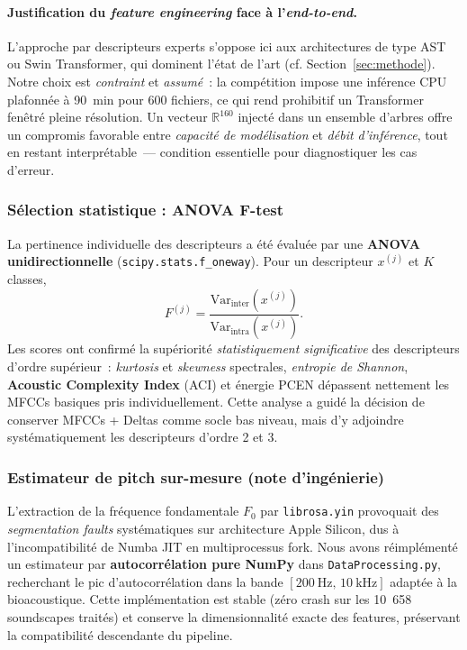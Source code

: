\paragraph{Justification du \textit{feature engineering} face à
    l'\textit{end-to-end}.} L'approche par descripteurs experts s'oppose
ici aux architectures de type AST ou Swin Transformer, qui dominent
l'état de l'art (cf. Section~\ref{sec:methode}). Notre choix est
\textit{contraint} et \textit{assumé}~: la compétition impose une
inférence CPU plafonnée à 90~min pour 600 fichiers, ce qui rend
prohibitif un Transformer fenêtré pleine résolution. Un vecteur
$\mathbb{R}^{160}$ injecté dans un ensemble d'arbres offre un compromis
favorable entre \textit{capacité de modélisation} et \textit{débit
    d'inférence}, tout en restant interprétable~— condition essentielle pour
diagnostiquer les cas d'erreur.

\subsubsection{Sélection statistique : ANOVA F-test}
La pertinence individuelle des descripteurs a été évaluée par une
\textbf{ANOVA unidirectionnelle} (\texttt{scipy.stats.f\_oneway}).
Pour un descripteur $x^{(j)}$ et $K$ classes,
\[
    F^{(j)} = \frac{\mathrm{Var}_{\text{inter}}(x^{(j)})}
    {\mathrm{Var}_{\text{intra}}(x^{(j)})}.
\]
Les scores ont confirmé la supériorité \textit{statistiquement
    significative} des descripteurs d'ordre supérieur~: \textit{kurtosis} et
\textit{skewness} spectrales, \textit{entropie de Shannon},
\textbf{Acoustic Complexity Index} (ACI) et énergie PCEN dépassent
nettement les MFCCs basiques pris individuellement. Cette analyse a guidé
la décision de conserver MFCCs + Deltas comme socle bas niveau, mais d'y
adjoindre systématiquement les descripteurs d'ordre 2 et 3.

\subsubsection{Estimateur de pitch sur-mesure (note d'ingénierie)}
L'extraction de la fréquence fondamentale $F_0$ par
\texttt{librosa.yin} provoquait des \textit{segmentation faults}
systématiques sur architecture Apple Silicon, dus à l'incompatibilité de
Numba JIT en multiprocessus fork. Nous avons réimplémenté un estimateur
par \textbf{autocorrélation pure NumPy} dans
\texttt{DataProcessing.py}, recherchant le pic d'autocorrélation dans
la bande $[200~\mathrm{Hz},\,10~\mathrm{kHz}]$ adaptée à la bioacoustique.
Cette implémentation est stable (zéro crash sur les 10~658
soundscapes traités) et conserve la dimensionnalité exacte des features,
préservant la compatibilité descendante du pipeline.

